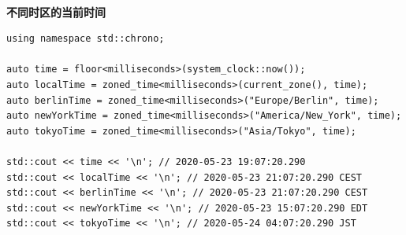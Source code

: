 \hspace*{\fill} \\ %
\noindent
\textbf{不同时区的当前时间}
\begin{lstlisting}[style=styleCXX]
using namespace std::chrono;

auto time = floor<milliseconds>(system_clock::now());
auto localTime = zoned_time<milliseconds>(current_zone(), time);
auto berlinTime = zoned_time<milliseconds>("Europe/Berlin", time);
auto newYorkTime = zoned_time<milliseconds>("America/New_York", time);
auto tokyoTime = zoned_time<milliseconds>("Asia/Tokyo", time);

std::cout << time << '\n'; // 2020-05-23 19:07:20.290
std::cout << localTime << '\n'; // 2020-05-23 21:07:20.290 CEST
std::cout << berlinTime << '\n'; // 2020-05-23 21:07:20.290 CEST
std::cout << newYorkTime << '\n'; // 2020-05-23 15:07:20.290 EDT
std::cout << tokyoTime << '\n'; // 2020-05-24 04:07:20.290 JST
\end{lstlisting}

